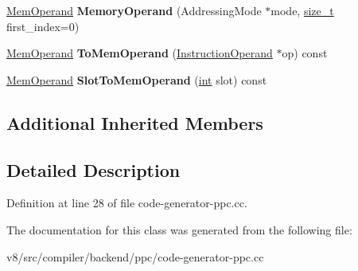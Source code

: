 \begin{DoxyCompactItemize}
\mbox{\hyperlink{classv8_1_1internal_1_1MemOperand}{Mem\+Operand}} {\bfseries Memory\+Operand} (Addressing\+Mode $\ast$mode, \mbox{\hyperlink{classsize__t}{size\+\_\+t}} first\+\_\+index=0)
\item 
\mbox{\label{classv8_1_1internal_1_1compiler_1_1PPCOperandConverter_a588a9a9999628b8355ffcdcfecf13909}} 
\mbox{\hyperlink{classv8_1_1internal_1_1MemOperand}{Mem\+Operand}} {\bfseries To\+Mem\+Operand} (\mbox{\hyperlink{classv8_1_1internal_1_1compiler_1_1InstructionOperand}{Instruction\+Operand}} $\ast$op) const
\item 
\mbox{\label{classv8_1_1internal_1_1compiler_1_1PPCOperandConverter_ac89e1936cef4e87f632880a31bedec34}} 
\mbox{\hyperlink{classv8_1_1internal_1_1MemOperand}{Mem\+Operand}} {\bfseries Slot\+To\+Mem\+Operand} (\mbox{\hyperlink{classint}{int}} slot) const
\end{DoxyCompactItemize}
\subsection*{Additional Inherited Members}


\subsection{Detailed Description}


Definition at line 28 of file code-\/generator-\/ppc.\+cc.



The documentation for this class was generated from the following file\+:\begin{DoxyCompactItemize}
\item 
v8/src/compiler/backend/ppc/code-\/generator-\/ppc.\+cc\end{DoxyCompactItemize}
